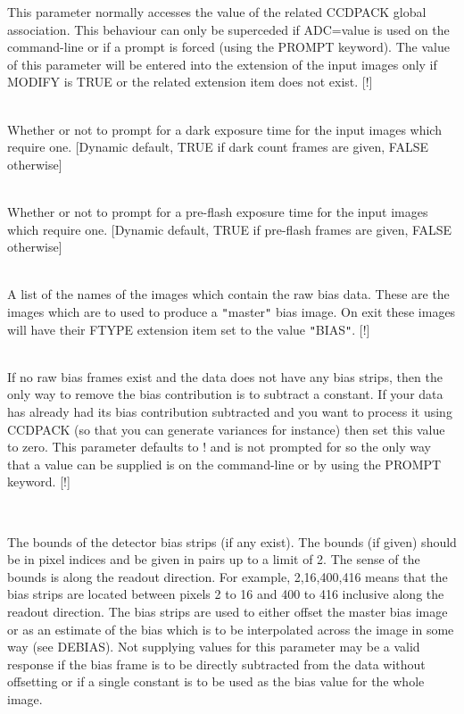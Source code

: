 \documentclass[twoside,11pt]{article}
\newcommand{\htmlref}[2]{#1}
\renewcommand{\_}{\texttt{\symbol{95}}}
\newcommand{\qt}[1]{{\tt "}#1{\tt "}}
\newcommand{\xroutine}[1]{\htmlref{{\sc #1}}{#1}}
\newcommand{\sstsubsection}[1]{ \item[{#1}] \mbox{} \\}
\newcommand{\sstsubsection}[1]{\item[{#1}]}
\begin{document}
{{{         This parameter normally accesses the value of the related
         CCDPACK global association. This behaviour can only be
         superceded if ADC=value is used on the command-line
         or if a prompt is forced (using the PROMPT keyword). The
         value of this parameter will be entered into the extension of
         the input images only if MODIFY is TRUE or the related extension
         item does not exist.
         [!]
      }
      \sstsubsection{
         ADDDARK = \_LOGICAL (Read)
      } {
         Whether or not to prompt for a dark exposure time for the input
         images which require one.
         [Dynamic default, TRUE if dark count frames are given, FALSE
         otherwise]
      }
      \sstsubsection{
         ADDFLASH = \_LOGICAL (Read)
      } {
         Whether or not to prompt for a pre-flash exposure time for the
         input images which require one.
         [Dynamic default, TRUE if pre-flash frames are given, FALSE
         otherwise]
      }
      \sstsubsection{
         BIAS = LITERAL (Read)
      } {
         A list of the names of the images which contain the raw bias
         data. These are the images which are to used to produce a
         \qt{master} bias image. On exit these images will have their FTYPE
         extension item set to the value \qt{BIAS}.
         [!]
      }
      \sstsubsection{
         BIASVALUE = \_DOUBLE (Read)
      } {
         If no raw bias frames exist and the data does not have any bias
         strips, then the only way to remove the bias contribution is
         to subtract a constant. If your data has already had its bias
         contribution subtracted and you want to process it using
         CCDPACK (so that you can generate variances for instance) then
         set this value to zero. This parameter defaults to ! and is not
         prompted for so the only way that a value can be supplied is on
         the command-line or by using the PROMPT keyword.
         [!]
      }
      \sstsubsection{
         BOUNDS( 2 or 4 ) = \_INTEGER (Read)
      } {
         The bounds of the detector bias strips (if any exist). The
         bounds (if given) should be in pixel indices and be given in
         pairs up to a limit of 2. The sense of the bounds is along the
         readout direction.  For example, 2,16,400,416 means that the
         bias strips are located between pixels 2 to 16 and 400 to 416
         inclusive along the readout direction. The bias strips are
         used to either offset the master bias image or as an estimate of
         the bias which is to be interpolated across the image in some
         way (see \xroutine{DEBIAS}). Not supplying values for this parameter may
         be a valid response if the bias frame is to be directly
         subtracted from the data without offsetting or if a single
         constant is to be used as the bias value for the whole image.

}}}
\end{document}
